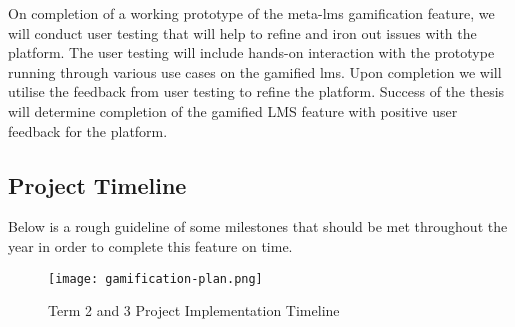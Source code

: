 On completion of a working prototype of the meta-lms gamification feature, we will conduct user testing that will help to refine and iron out issues with the platform. The user testing will include hands-on interaction with the prototype running through various use cases on the gamified lms. Upon completion we will utilise the feedback from user testing to refine the platform. Success of the thesis will determine completion of the gamified LMS feature with positive user feedback for the platform.

\newpage

\subsection{Project Timeline}
Below is a rough guideline of some milestones that should be met throughout the year in order to complete this feature on time.

\begin{figure}[h!]
    \texttt{[image: gamification-plan.png]}
    \centering
    \caption{Term 2 and 3 Project Implementation Timeline}
\end{figure}

\newpage